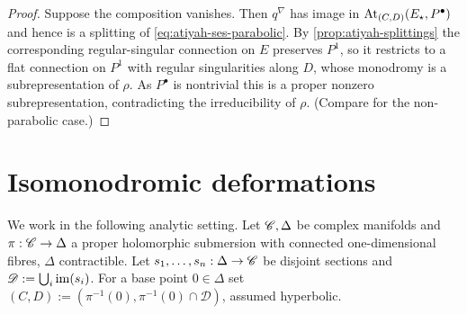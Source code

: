 \begin{proof}
  Suppose the composition vanishes. Then $q^\nabla$ has image in
  $\operatorname{At}_{(C,D)}(E_\star,P^\bullet)$ and hence is a splitting of
  \eqref{eq:atiyah-ses-parabolic}. By \cref{prop:atiyah-splittings} the
  corresponding regular-singular connection on $E$ preserves $P^1$, so it
  restricts to a flat connection on $P^1$ with regular singularities along $D$,
  whose monodromy is a subrepresentation of $\rho$. As $P^\bullet$ is nontrivial
  this is a proper nonzero subrepresentation, contradicting the irreducibility of
  $\rho$. (Compare \cite[Proof of Proposition 5.3]{BHH:logarithmic} for the
  non-parabolic case.)
\end{proof}

\section{Isomonodromic deformations}
\label{sec:deformation-isomonodromy}

We work in the following analytic setting. Let $\mathscr{C}, \Delta$ be complex
manifolds and $\pi: \mathscr{C} \to \Delta$ a proper holomorphic submersion with
connected one-dimensional fibres, $\Delta$ contractible. Let
$s_1,\dots,s_n: \Delta \to \mathscr{C}$ be disjoint sections and
$\mathscr{D} := \bigcup_i \operatorname{im}(s_i)$. For a base point $0 \in \Delta$ set
$(C,D) := (\pi^{-1}(0), \pi^{-1}(0) \cap \mathscr{D})$, assumed hyperbolic.

